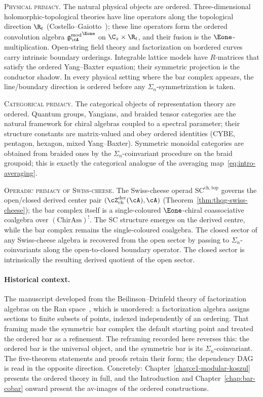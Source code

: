 \textsc{Physical primacy.} The natural physical objects are
ordered. Three-dimensional holomorphic-topological theories
have line operators along the topological direction $\R_t$
(Costello--Gaiotto~\cite{CostelloGaiotto2020}); these line operators
form the ordered convolution algebra ${\gAmod}^{\Eone}$ on
$\C_z \times \R_t$, and their fusion is the
$\Eone$-multiplication. Open-string field theory and
factorization on bordered curves carry intrinsic boundary
orderings. Integrable lattice models have $R$-matrices that
satisfy the ordered Yang--Baxter equation; their symmetric projection
is the conductor shadow. In every physical setting where the bar complex
appears, the line/boundary direction is ordered before any
$\Sigma_n$-symmetrization is taken.

\textsc{Categorical primacy.} The categorical objects of
representation theory are ordered. Quantum groups, Yangians, and
braided tensor categories are the natural framework for chiral
algebras coupled to a spectral parameter; their structure
constants are matrix-valued and obey ordered identities (CYBE,
pentagon, hexagon, mixed Yang--Baxter). Symmetric monoidal
categories are obtained from braided ones by the
$\Sigma_n$-coinvariant procedure on the braid groupoid; this is
exactly the categorical analogue of the averaging
map~\eqref{eq:intro-averaging}.

\textsc{Operadic primacy of Swiss-cheese.} The Swiss-cheese
operad $\mathrm{SC}^{\mathrm{ch},\mathrm{top}}$ governs the
open/closed derived center pair $(\cZ^{\mathrm{der}}_{\mathrm{ch}}(\cA), \cA)$
(Theorem~\ref{thm:thqg-swiss-cheese}); the bar complex itself
is a single-coloured $\Eone$-chiral coassociative coalgebra
over $(\mathrm{ChirAss})^!$. The SC structure emerges on the
derived centre, while the bar complex remains the single-coloured
coalgebra. The closed sector of any
Swiss-cheese algebra is recovered from the open sector by passing
to $\Sigma_n$-coinvariants along the open-to-closed boundary
operator. The closed sector is intrinsically the resulting derived
quotient of the open sector.

\paragraph{Historical context.}
The manuscript developed from the Beilinson--Drinfeld theory of
factorization algebras on the Ran space~\cite{BD04}, which is
unordered: a factorization algebra assigns sections to finite
subsets of points, indexed independently of an ordering. That framing made the
symmetric bar complex the default starting point and treated the
ordered bar as a refinement. The reframing
recorded here reverses this: the ordered bar is the
universal object, and the symmetric bar is its
$\Sigma_n$-coinvariant. The five-theorem statements and proofs retain
their form; the dependency DAG is read in the opposite direction.
Concretely:
Chapter~\ref{chap:e1-modular-koszul} presents the ordered theory
in full, and the Introduction and
Chapter~\ref{chap:bar-cobar} onward present the av-images of the
ordered constructions.

